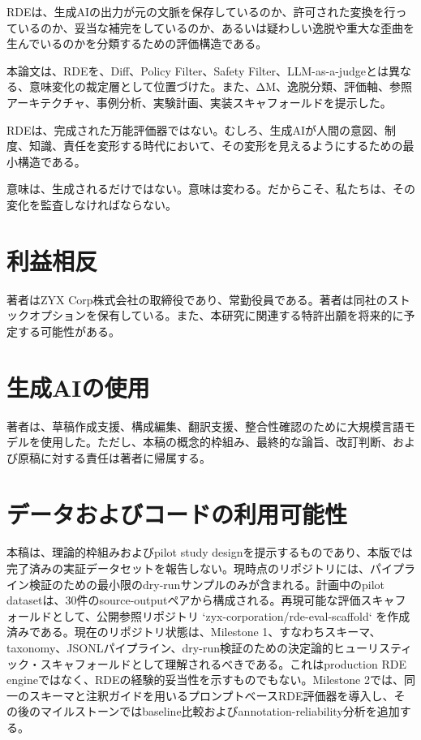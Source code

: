 \documentclass[
  a4paper]{ltjsarticle}
\begin{document}
RDEは、生成AIの出力が元の文脈を保存しているのか、許可された変換を行っているのか、妥当な補完をしているのか、あるいは疑わしい逸脱や重大な歪曲を生んでいるのかを分類するための評価構造である。

本論文は、RDEを、Diff、Policy Filter、Safety
Filter、LLM-as-a-judgeとは異なる、意味変化の裁定層として位置づけた。また、ΔM、逸脱分類、評価軸、参照アーキテクチャ、事例分析、実験計画、実装スキャフォールドを提示した。

RDEは、完成された万能評価器ではない。むしろ、生成AIが人間の意図、制度、知識、責任を変形する時代において、その変形を見えるようにするための最小構造である。

意味は、生成されるだけではない。意味は変わる。だからこそ、私たちは、その変化を監査しなければならない。

\section*{利益相反}
著者はZYX Corp株式会社の取締役であり、常勤役員である。著者は同社のストックオプションを保有している。また、本研究に関連する特許出願を将来的に予定する可能性がある。

\section*{生成AIの使用}
著者は、草稿作成支援、構成編集、翻訳支援、整合性確認のために大規模言語モデルを使用した。ただし、本稿の概念的枠組み、最終的な論旨、改訂判断、および原稿に対する責任は著者に帰属する。

\section*{データおよびコードの利用可能性}
本稿は、理論的枠組みおよびpilot study designを提示するものであり、本版では完了済みの実証データセットを報告しない。現時点のリポジトリには、パイプライン検証のための最小限のdry-runサンプルのみが含まれる。計画中のpilot datasetは、30件のsource-outputペアから構成される。再現可能な評価スキャフォールドとして、公開参照リポジトリ `zyx-corporation/rde-eval-scaffold` を作成済みである。現在のリポジトリ状態は、Milestone 1、すなわちスキーマ、taxonomy、JSONLパイプライン、dry-run検証のための決定論的ヒューリスティック・スキャフォールドとして理解されるべきである。これはproduction RDE engineではなく、RDEの経験的妥当性を示すものでもない。Milestone 2では、同一のスキーマと注釈ガイドを用いるプロンプトベースRDE評価器を導入し、その後のマイルストーンではbaseline比較およびannotation-reliability分析を追加する。
\end{document}
